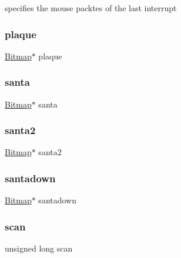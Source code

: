 specifies the mouse packtes of the last interrupt 

\mbox{\label{struct_game_a77cd2a4f34d97866c63f80dd3cb7a474}} 
\subsubsection{\texorpdfstring{plaque}{plaque}}
{\footnotesize\ttfamily \hyperlink{struct_bitmap}{Bitmap}$\ast$ plaque}

\mbox{\label{struct_game_add8cae6a79535ad03e93471b7fa8966f}} 
\subsubsection{\texorpdfstring{santa}{santa}}
{\footnotesize\ttfamily \hyperlink{struct_bitmap}{Bitmap}$\ast$ santa}

\mbox{\label{struct_game_a659095d2d4fbfc3a0e6cfefed6c9df67}} 
\subsubsection{\texorpdfstring{santa2}{santa2}}
{\footnotesize\ttfamily \hyperlink{struct_bitmap}{Bitmap}$\ast$ santa2}

\mbox{\label{struct_game_a8e2568ac990bf65b346207c38f9b9d30}} 
\subsubsection{\texorpdfstring{santadown}{santadown}}
{\footnotesize\ttfamily \hyperlink{struct_bitmap}{Bitmap}$\ast$ santadown}

\mbox{\label{struct_game_a6804e7fc07260f01e4dc9db73879948a}} 
\subsubsection{\texorpdfstring{scan}{scan}}
{\footnotesize\ttfamily unsigned long scan}



